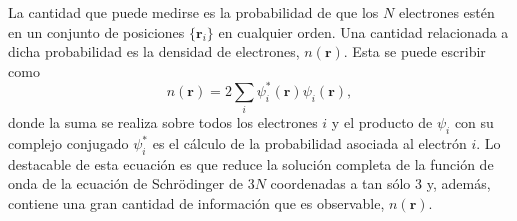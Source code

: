 La cantidad que puede medirse es la probabilidad de que los $N$ electrones 
estén en un conjunto de posiciones $\lbrace \mathbf{r}_i \rbrace$ en cualquier orden. 
Una cantidad relacionada a dicha probabilidad es la densidad de electrones,
$n(\mathbf{r})$. Esta se puede escribir como 
\begin{equation}
    n(\mathbf{r}) = 2 \sum_i \psi_i^*(\mathbf{r}) \psi_i(\mathbf{r}),
\end{equation}
donde la suma se realiza sobre todos los electrones $i$ y el producto de $\psi_i$ con su 
complejo conjugado $\psi_i^*$ es el cálculo de la probabilidad asociada al electrón $i$. 
Lo destacable de esta ecuación es que reduce la solución completa de la función de onda
de la ecuación de Schrödinger de $3 N$ coordenadas a tan sólo 3 y, además, contiene una 
gran cantidad de información que es observable, $n(\mathbf{r})$.




